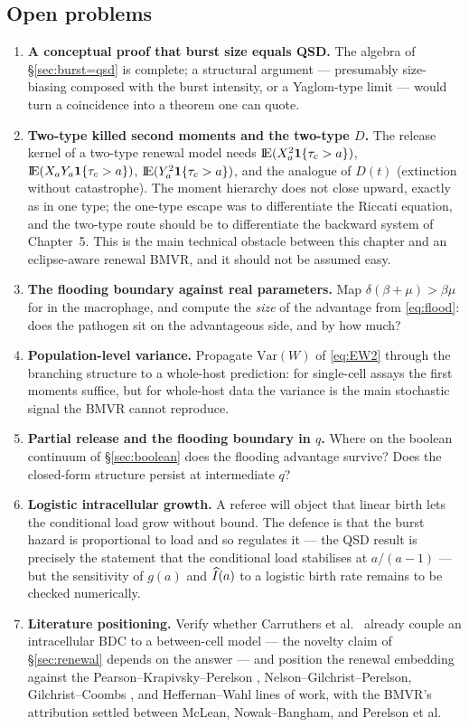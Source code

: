 \subsection{Open problems}
\label{sec:open-problems}

\begin{enumerate}
\item \textbf{A conceptual proof that burst size equals QSD.} The algebra
of \S\ref{sec:burst=qsd} is complete; a structural argument --- presumably
size-biasing composed with the burst intensity, or a Yaglom-type limit
\cite{yaglom1947certain} --- would turn a coincidence into a theorem one
can quote.
\item \textbf{Two-type killed second moments and the two-type $D$.} The
release kernel of a two-type renewal model needs
${\rm I}\!{\rm E}(X_a^2\mathbf1\{\tau_c>a\})$, ${\rm I}\!{\rm E}(X_aY_a\mathbf1\{\tau_c>a\})$,
${\rm I}\!{\rm E}(Y_a^2\mathbf1\{\tau_c>a\})$, and the analogue of $D(t)$
(extinction without catastrophe). The moment hierarchy does not close
upward, exactly as in one type; the one-type escape was to differentiate
the Riccati equation, and the two-type route should be to differentiate the
backward system of Chapter~5. This is the main technical obstacle between
this chapter and an eclipse-aware renewal BMVR, and it should not be
assumed easy.
\item \textbf{The flooding boundary against real parameters.} Map
$\delta(\beta+\mu)>\beta\mu$ for \yp{} in the macrophage, and compute the
\emph{size} of the advantage from \eqref{eq:flood}: does the pathogen sit
on the advantageous side, and by how much?
\item \textbf{Population-level variance.} Propagate $\mathrm{Var}(W)$ of
\eqref{eq:EW2} through the branching structure to a whole-host prediction:
for single-cell assays the first moments suffice, but for whole-host data
the variance is the main stochastic signal the BMVR cannot reproduce.
\item \textbf{Partial release and the flooding boundary in $q$.} Where on
the boolean continuum of \S\ref{sec:boolean} does the flooding advantage
survive? Does the closed-form structure persist at intermediate $q$?
\item \textbf{Logistic intracellular growth.} A referee will object that
linear birth lets the conditional load grow without bound. The defence is
that the burst hazard is proportional to load and so regulates it --- the
QSD result is precisely the statement that the conditional load stabilises
at $a/(a-1)$ --- but the sensitivity of $g(a)$ and $\widehat{I}(a)$ to a logistic
birth rate remains to be checked numerically.
\item \textbf{Literature positioning.} Verify whether Carruthers et al.\
\cite{carruthers2020stochastic} already couple an intracellular BDC to a
between-cell model --- the novelty claim of \S\ref{sec:renewal} depends on
the answer --- and position the renewal embedding against the
Pearson--Krapivsky--Perelson \cite{pearson2011stochastic},
Nelson--Gilchrist--Perelson, Gilchrist--Coombs
\cite{gilchrist2006evolution}, and Heffernan--Wahl lines of work, with the
BMVR's attribution settled between McLean, Nowak--Bangham, and Perelson et
al.
\end{enumerate}
